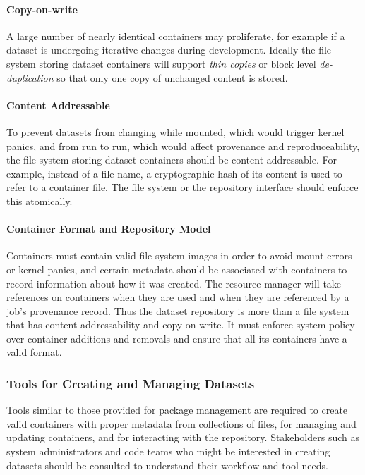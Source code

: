 \paragraph{Copy-on-write}
A large number of nearly identical containers may proliferate, for example
if a dataset is undergoing iterative changes during development.
Ideally the file system storing dataset containers will support
{\em thin copies} or block level {\em de-duplication} so that only one
copy of unchanged content is stored.

\paragraph{Content Addressable}
To prevent datasets from changing while mounted, which would trigger
kernel panics, and from run to run, which would affect provenance and
reproduceability, the file system storing dataset containers should
be content addressable.  For example, instead of a file name, a cryptographic
hash of its content is used to refer to a container file.
The file system or the repository interface should enforce this atomically.

\paragraph{Container Format and Repository Model}
Containers must contain valid file system images in order to avoid
mount errors or kernel panics, and certain metadata should be associated
with containers to record information about how it was created.
The resource manager will take references on containers when they are used
and when they are referenced by a job's provenance record.
Thus the dataset repository is more than a file system that has
content addressability and copy-on-write.
It must enforce system policy over container additions and
removals and ensure that all its containers have a valid format.

\subsubsection{Tools for Creating and Managing Datasets}

Tools similar to those provided for package management are required to
create valid containers with proper metadata from collections of files,
for managing and updating containers, and for interacting with the repository.
Stakeholders such as system administrators and code teams who might
be interested in creating datasets should be consulted to understand
their workflow and tool needs.  


